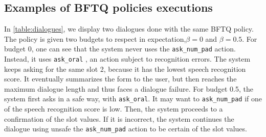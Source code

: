 \subsection{Examples of BFTQ policies executions}
\label{sec:bftq-executions}

In \cref{table:dialogues}, we display two dialogues done with the same BFTQ policy. The policy is given two budgets to respect in expectation,$\beta=0$ and $\beta=0.5$. For budget 0, one can see that the system never uses the \texttt{ask\_num\_pad} action. Instead, it uses \texttt{ask\_oral} , an action subject to recognition errors. The system keeps asking for the same slot 2, because it has the lowest speech recognition score. It eventually summarizes the form to the user, but then reaches the maximum dialogue length and thus faces a dialogue failure. For budget 0.5, the system first asks in a safe way, with \texttt{ask\_oral}. It may want to \texttt{ask\_num\_pad} if one of the speech recognition score is low. Then, the system proceeds to a confirmation of the slot values. If it is incorrect, the system continues the dialogue using unsafe the \texttt{ask\_num\_pad} action to be certain of the slot values.





% 
% 
% 

